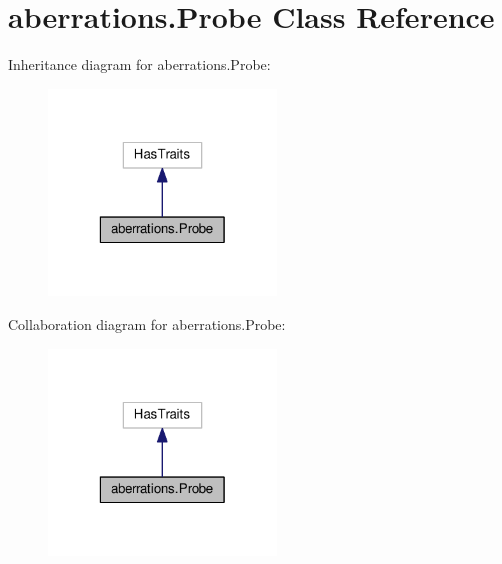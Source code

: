 \hypertarget{classaberrations_1_1_probe}{\section{aberrations.\-Probe Class Reference}
\label{classaberrations_1_1_probe}
}


Inheritance diagram for aberrations.\-Probe\-:
\nopagebreak
\begin{figure}[H]
\begin{center}
\leavevmode
\includegraphics[width=172pt]{classaberrations_1_1_probe__inherit__graph}
\end{center}
\end{figure}


Collaboration diagram for aberrations.\-Probe\-:
\nopagebreak
\begin{figure}[H]
\begin{center}
\leavevmode
\includegraphics[width=172pt]{classaberrations_1_1_probe__coll__graph}
\end{center}
\end{figure}
